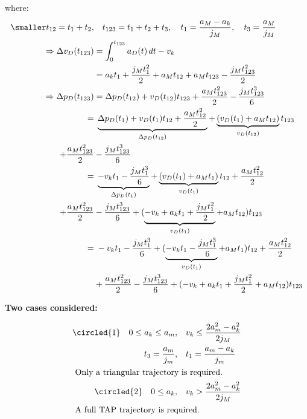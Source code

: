 where:
\begin{align}
  \smaller
   t_{12} = t_1 + t_2, & \quad t_{123} = t_1 + t_2 + t_3, \quad
   t_1 = \frac{a_M - a_k}{j_M}, \quad t_3 = \frac{a_M}{j_M} \\
   \Rightarrow \Delta v_D(t_{123}) &= \int_{0}^{t_{123}} a_D(t) \,dt - v_k \\
    &= a_k t_1 + \frac{j_M t_1^2}{2} +a_Mt_{12} + a_M t_{123} - \frac{j_M t_{123}^2}{2} \\
    \Rightarrow \Delta p_D(t_{123}) &= \Delta p_D(t_{12}) + v_D(t_{12})t_{123} + \frac{a_M t_{123}^2}{2} - \frac{j_M t_{123}^3}{6} \\
    = &\;\underbrace{\Delta p_D(t_1) + v_D(t_1)t_{12} + \frac{a_Mt_{12}^2}{2}}_{\Delta p_D(t_{12})}
     + \underbrace{(v_D(t_1) + a_M t_{12})}_{v_D(t_{12})} t_{123} \nonumber\\
    + \frac{a_M t_{123}^2}{2} &- \frac{j_M t_{123}^3}{6} \\
    = & \; \underbrace{-v_k t_1 - \frac{j_M t_1^3}{6}}_{\Delta p_D(t_1)}
        + \underbrace{(v_D(t_1)+a_Mt_1)}_{v_D(t_1)}t_{12} + \frac{a_Mt_{12}^2}{2} \nonumber\\
  + \frac{a_M t_{123}^2}{2}    &- \frac{j_M t_{123}^3}{6}   +( \underbrace{-v_k + a_k t_1 + \frac{j_M t_1^2}{2}}_{v_D(t_1)} + a_M t_{12}) t_{123} \\
  = & \; -v_k t_1 - \frac{j_M t_1^3}{6}
      + (\underbrace{-v_k t_1 - \frac{j_Mt_1^3}{6}}_{v_D(t_1)}+a_Mt_1)t_{12} + \frac{a_Mt_{12}^2}{2} \nonumber\\
  & + \frac{a_M t_{123}^2}{2} - \frac{j_M t_{123}^3}{6}   +( -v_k + a_k t_1 + \frac{j_M t_1^2}{2} + a_M t_{12}) t_{123}
\end{align}

\textbf{Two cases considered:}

\begin{align}
\circled{1}  \quad 0\leq a_k \leq a_m, & \quad v_k \leq \frac{2 a_m^2 - a_k^2}{2j_M} \\
  \quad t_3 = \frac{a_m}{j_m}, & \quad t_1 = \frac{a_m - a_k}{j_m} \\
\shortintertext{
Only a triangular trajectory is required.
}
\circled{2}  \quad 0\leq a_k, & \quad v_k > \frac{2 a_m^2 - a_k^2}{2j_M} \\
\shortintertext{
  A full TAP trajectory is required.
}
\end{align}
